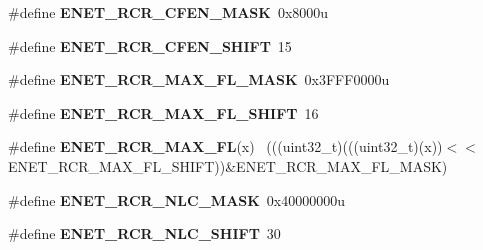 \begin{DoxyCompactItemize}
\item 
\hypertarget{group___e_n_e_t___register___masks_ga37304dd0d74e9be8367adad2e57ce358}{}\#define {\bfseries E\+N\+E\+T\+\_\+\+R\+C\+R\+\_\+\+C\+F\+E\+N\+\_\+\+M\+A\+S\+K}~0x8000u\label{group___e_n_e_t___register___masks_ga37304dd0d74e9be8367adad2e57ce358}

\item 
\hypertarget{group___e_n_e_t___register___masks_ga01c9e6e46880a41e6219729598048b1e}{}\#define {\bfseries E\+N\+E\+T\+\_\+\+R\+C\+R\+\_\+\+C\+F\+E\+N\+\_\+\+S\+H\+I\+F\+T}~15\label{group___e_n_e_t___register___masks_ga01c9e6e46880a41e6219729598048b1e}

\item 
\hypertarget{group___e_n_e_t___register___masks_ga1e61cf8300255cf3f9873a6bd9e1ffe6}{}\#define {\bfseries E\+N\+E\+T\+\_\+\+R\+C\+R\+\_\+\+M\+A\+X\+\_\+\+F\+L\+\_\+\+M\+A\+S\+K}~0x3\+F\+F\+F0000u\label{group___e_n_e_t___register___masks_ga1e61cf8300255cf3f9873a6bd9e1ffe6}

\item 
\hypertarget{group___e_n_e_t___register___masks_ga835b5d285dad4b324f26c4edcc4e00d1}{}\#define {\bfseries E\+N\+E\+T\+\_\+\+R\+C\+R\+\_\+\+M\+A\+X\+\_\+\+F\+L\+\_\+\+S\+H\+I\+F\+T}~16\label{group___e_n_e_t___register___masks_ga835b5d285dad4b324f26c4edcc4e00d1}

\item 
\hypertarget{group___e_n_e_t___register___masks_ga233de8313f66ac3559d596c8b474b436}{}\#define {\bfseries E\+N\+E\+T\+\_\+\+R\+C\+R\+\_\+\+M\+A\+X\+\_\+\+F\+L}(x)                                          ~(((uint32\+\_\+t)(((uint32\+\_\+t)(x))$<$$<$E\+N\+E\+T\+\_\+\+R\+C\+R\+\_\+\+M\+A\+X\+\_\+\+F\+L\+\_\+\+S\+H\+I\+F\+T))\&E\+N\+E\+T\+\_\+\+R\+C\+R\+\_\+\+M\+A\+X\+\_\+\+F\+L\+\_\+\+M\+A\+S\+K)\label{group___e_n_e_t___register___masks_ga233de8313f66ac3559d596c8b474b436}

\item 
\hypertarget{group___e_n_e_t___register___masks_ga2674365ca4dece5419e50ec62cfdd87c}{}\#define {\bfseries E\+N\+E\+T\+\_\+\+R\+C\+R\+\_\+\+N\+L\+C\+\_\+\+M\+A\+S\+K}~0x40000000u\label{group___e_n_e_t___register___masks_ga2674365ca4dece5419e50ec62cfdd87c}

\item 
\hypertarget{group___e_n_e_t___register___masks_gabd7c089e6785c4900d6fc5491db4f5ce}{}\#define {\bfseries E\+N\+E\+T\+\_\+\+R\+C\+R\+\_\+\+N\+L\+C\+\_\+\+S\+H\+I\+F\+T}~30\label{group___e_n_e_t___register___masks_gabd7c089e6785c4900d6fc5491db4f5ce}


\end{DoxyCompactItemize}
